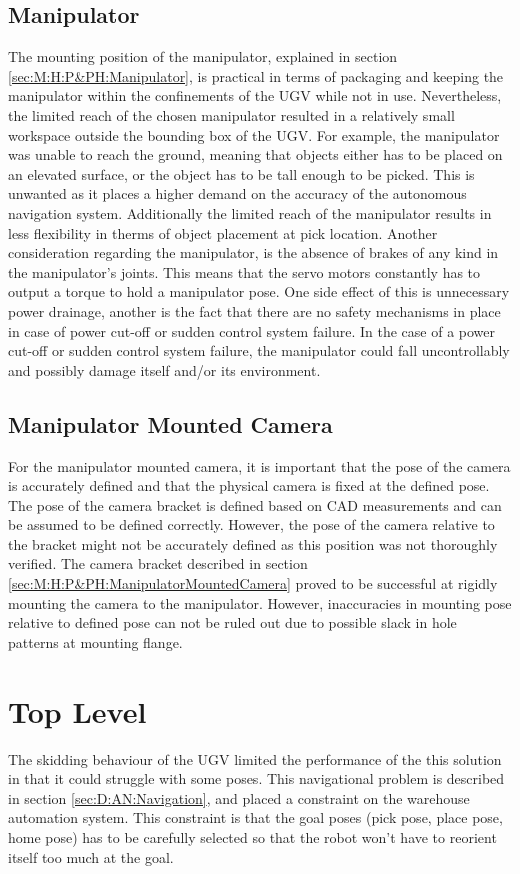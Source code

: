 \subsection{Manipulator} \label{sec:D:PAP:Manipulator}
The mounting position of the manipulator, explained in section \ref{sec:M:H:P&PH:Manipulator}, is practical in terms of packaging and keeping the manipulator within the confinements of the UGV while not in use. Nevertheless, the limited reach of the chosen manipulator resulted in a relatively small workspace outside the bounding box of the UGV. For example, the manipulator was unable to reach the ground, meaning that objects either has to be placed on an elevated surface, or the object has to be tall enough to be picked. This is unwanted as it places a higher demand on the accuracy of the autonomous navigation system. Additionally the limited reach of the manipulator results in less flexibility in therms of object placement at pick location.
Another consideration regarding the manipulator, is the absence of brakes of any kind in the manipulator's joints. This means that the servo motors constantly has to output a torque to hold a manipulator pose. One side effect of this is unnecessary power drainage, another is the fact that there are no safety mechanisms in place in case of power cut-off or sudden control system failure. In the case of a power cut-off or sudden control system failure, the manipulator could fall uncontrollably and possibly damage itself and/or its environment.

\subsection{Manipulator Mounted Camera}\label{sec:D:PAP:ManipulatorMountedCamera}
For the manipulator mounted camera, it is important that the pose of the camera is accurately defined and that the physical camera is fixed at the defined pose. The pose of the camera bracket is defined based on CAD measurements and can be assumed to be defined correctly. However, the pose of the camera relative to the bracket might not be accurately defined as this position was not thoroughly verified. 
The camera bracket described in section \ref{sec:M:H:P&PH:ManipulatorMountedCamera} proved to be successful at rigidly mounting the camera to the manipulator. However, inaccuracies in mounting pose relative to defined pose can not be ruled out due to possible slack in hole patterns at mounting flange.



\section{Top Level}
The skidding behaviour of the UGV limited the performance of the this solution in that it could struggle with some poses. This navigational problem is described in section \ref{sec:D:AN:Navigation}, and placed a constraint on the warehouse automation system. This constraint is that the goal poses (pick pose, place pose, home pose) has to be carefully selected so that the robot won't have to reorient itself too much at the goal. 

